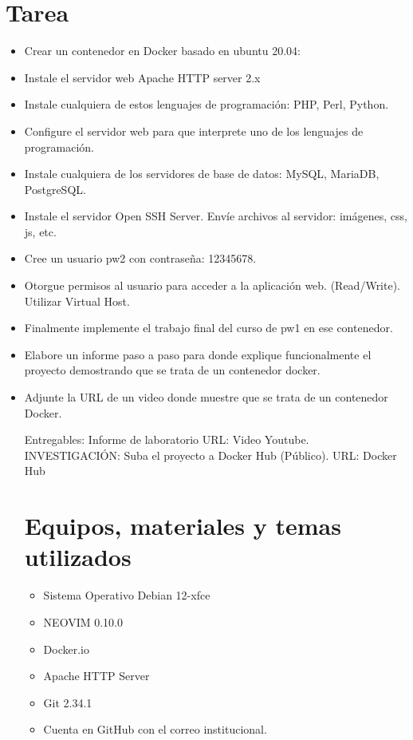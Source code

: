 \documentclass{article}
\begin{document}
	\section{Tarea}
	\begin{itemize}		



		\item  Crear un contenedor en Docker basado en ubuntu 20.04:
        \item Instale el servidor web Apache HTTP server 2.x
 \item Instale cualquiera de estos lenguajes de programación: PHP, Perl, Python.
 \item Configure el servidor web para que interprete uno de los lenguajes de programación.
 \item Instale cualquiera de los servidores de base de datos: MySQL, MariaDB, PostgreSQL.
 \item Instale el servidor Open SSH Server. Envíe archivos al servidor: imágenes, css, js, etc.
 \item Cree un usuario pw2 con contraseña: 12345678.
 \item Otorgue permisos al usuario para acceder a la aplicación web. (Read/Write). Utilizar Virtual Host.
 \item Finalmente implemente el trabajo final del curso de pw1 en ese contenedor.
  \item Elabore un informe paso a paso para donde explique funcionalmente el proyecto demostrando que se trata de un contenedor docker.
 \item Adjunte la URL de un video donde muestre que se trata de un contenedor Docker.

Entregables:
Informe de laboratorio
URL: Video Youtube.
INVESTIGACIÓN: Suba el proyecto a Docker Hub (Público).
URL: Docker Hub

  
		
	\section{Equipos, materiales y temas utilizados}
	\begin{itemize}
		\item Sistema Operativo Debian 12-xfce
		\item NEOVIM 0.10.0
		\item Docker.io
        \item Apache HTTP Server
		\item Git 2.34.1
		\item Cuenta en GitHub con el correo institucional.
	\end{itemize}
	

\end{itemize}
\end{document}
